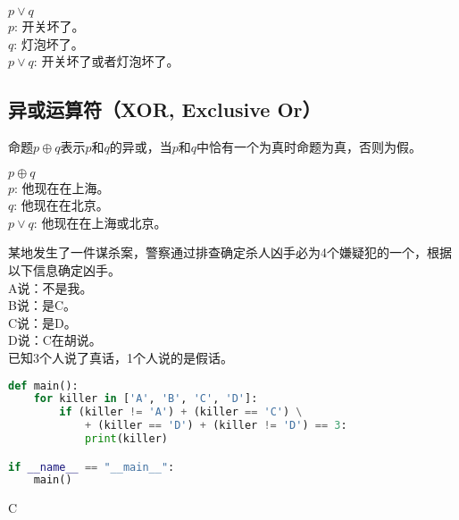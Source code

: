 \documentclass[12pt, openany, oneside]{book}
\begin{document}
\begin{tcolorbox}
    $ p \vee q $ \\
    $ p $: 开关坏了。 \\
    $ q $: 灯泡坏了。 \\
    $ p \vee q $: 开关坏了或者灯泡坏了。
\end{tcolorbox}

\subsection{异或运算符（XOR, Exclusive Or）}

命题$ p \oplus q $表示$ p $和$ q $的异或，当$ p $和$ q $中恰有一个为真时命题为真，否则为假。

\begin{table}[H]
    \centering
    \caption{XOR真值表}
\end{table}

\begin{tcolorbox}
    $ p \oplus q $ \\
    $ p $: 他现在在上海。 \\
    $ q $: 他现在在北京。 \\
    $ p \vee q $: 他现在在上海或北京。
\end{tcolorbox}

\begin{tcolorbox}
    某地发生了一件谋杀案，警察通过排查确定杀人凶手必为4个嫌疑犯的一个，根据以下信息确定凶手。 \\
    A说：不是我。 \\
    B说：是C。 \\
    C说：是D。 \\
    D说：C在胡说。 \\
    已知3个人说了真话，1个人说的是假话。
\end{tcolorbox}

\vspace{-0.5cm}
\begin{lstlisting}[language=Python]
def main():
    for killer in ['A', 'B', 'C', 'D']:
        if (killer != 'A') + (killer == 'C') \
            + (killer == 'D') + (killer != 'D') == 3:
            print(killer)

if __name__ == "__main__":
    main()
\end{lstlisting}

\begin{tcolorbox}
    C
\end{tcolorbox}
\end{document}
